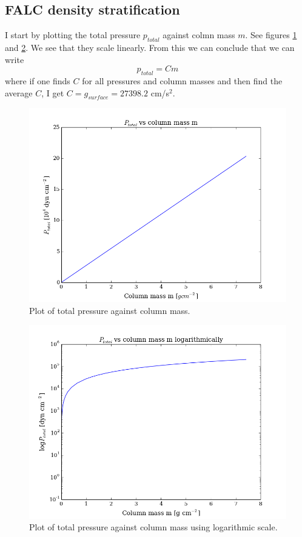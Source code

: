 \documentclass{aa}   %
\begin{document}
\subsection{FALC density stratification}
I start by plotting the total pressure $p_{total}$ against colmn mass $m$. See figures \ref{falc_pressure} and \ref{falc_pressure_log}.
We see that they scale linearly. From this we can conclude that we can write 
\begin{equation}
 p_{total} = Cm
\end{equation}
where if one finds $C$ for all pressures and column masses and then find the average $C$, I get $C = g_{surface} = 27398.2$ cm/s$^2$.

\begin{figure}
 \includegraphics[width=.49\textwidth]{falc_pressure.png}
 \caption{Plot of total pressure against column mass.}
 \label{falc_pressure} 
\end{figure}
\begin{figure}
 \includegraphics[width=.49\textwidth]{falc_pressure_log.png}
 \caption{Plot of total pressure against column mass using logarithmic scale.}
 \label{falc_pressure_log} 
\end{figure}
\end{document}
